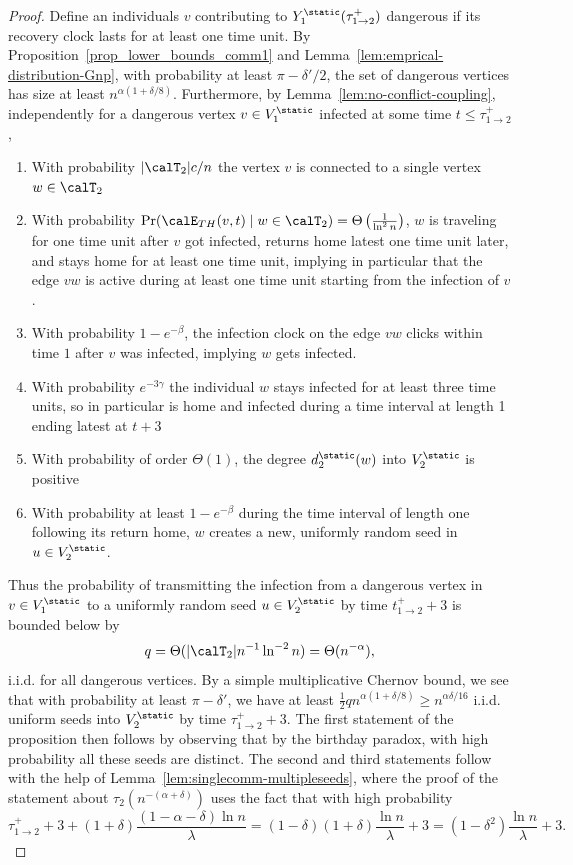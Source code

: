 \documentclass[11pt]{article}
\begin{document}
\begin{proof}
Define an individuals $v$ contributing to $Y_1^\static(\tau_{1\to 2}^+)$ dangerous if its recovery clock lasts for at least one time unit.   By Proposition~\ref{prop_lower_bounds_comm1} and Lemma~\ref{lem:emprical-distribution-Gnp},  with probability at least $\pi-\delta'/2$, the 
set of
dangerous vertices has size at least $ n^{\alpha(1+\delta/8)}$.
 Furthermore, by Lemma~\ref{lem:no-conflict-coupling},
independently for a dangerous vertex $v\in V_1^\static$ infected at some time $t\leq \tau_{1\to 2}^+$,
\begin{enumerate}
\item  With probability $|\calT_2|c/n$ the vertex $v$ is connected to a single vertex $w\in \calT_2$ 
\item With probability  $\Pr(\calE_{TH}(v,t)\mid w\in \calT_2)=\Theta\left(\frac 1{\ln^2 n}\right)$, $w$ is traveling for one time unit after $v$ got infected, returns home latest one time unit later, and stays home for at least one time unit, implying in particular that the edge $vw$ is active during at least one time unit starting from the infection of $v$.
\item With probability $1-e^{-\beta}$, the infection clock on the edge $vw$ clicks within time $1$ after $v$ was infected, implying $w$ gets infected.
\item With probability $e^{-3\gamma}$ the individual $w$  stays infected for at least three time units, so in particular is home and infected during a time interval at length 1 ending latest at $t+3$
\item With probability of order $\Theta(1)$, the degree $d_2^\static(w)$
into $V_2^\static$ is positive
\item With probability at least $1-e^{-\beta}$ during the time interval of length one following its return home, $w$ creates a new, uniformly random seed in $u\in V_2^\static$.
\end{enumerate}
Thus the probability of transmitting the infection from a dangerous vertex in $v\in V_1^\static$ to a uniformly random seed $u\in V_2^\static$ by time $t_{1\to 2}^++3$ is bounded below by
$$q=\Theta(|\calT_2| n^{-1}\ln^{-2}n)=\Theta(n^{-\alpha}),
$$
i.i.d. for all dangerous vertices. By a simple multiplicative Chernov bound, 
we see that with probability at least $\pi-\delta'$, we have at least $\frac 12 q  n^{\alpha(1+\delta/8)} \geq n^{\alpha\delta/16}$ i.i.d. uniform seeds into $V_2^\static$
by time $\tau_{1\to2}^++3$.
The first statement of the proposition then follows by observing that by the birthday paradox, with high probability all these seeds are distinct.
The second and third statements follow with the help of Lemma~\ref{lem:singlecomm-multipleseeds}, where the proof of the statement about $\tau_2(n^{-(\alpha+\delta)})$ uses the fact that with high probability
$$
\tau_{1\to 2}^+ +3+(1+\delta)\frac{(1-\alpha-\delta)\ln n}\lambda=(1-\delta)(1+\delta)\frac{\ln n}\lambda +3 =(1-\delta^2)\frac{\ln n}\lambda+3.
$$
\end{proof}
\end{document}

